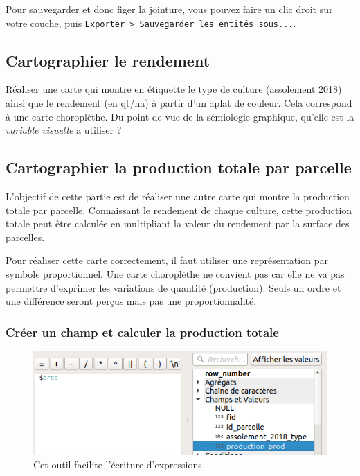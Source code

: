 Pour sauvegarder et donc figer la jointure, vous pouvez faire un clic
droit sur votre couche, puis
\texttt{Exporter\ \textgreater{}\ Sauvegarder\ les\ entités\ sous...}.

\subsection{Cartographier le
rendement}\label{cartographier-le-rendement}

Réaliser une carte qui montre en étiquette le type de culture
(assolement 2018) ainsi que le rendement (en qt/ha) à partir d'un aplat
de couleur. Cela correspond à une carte choroplèthe. Du point de vue de
la sémiologie graphique, qu'elle est la \emph{variable visuelle} a
utiliser ?

\subsection{Cartographier la production totale par
parcelle}\label{cartographier-la-production-totale-par-parcelle}

L'objectif de cette partie est de réaliser une autre carte qui montre la
production totale par parcelle. Connaissant le rendement de chaque
culture, cette production totale peut être calculée en multipliant la
valeur du rendement par la surface des parcelles.

Pour réaliser cette carte correctement, il faut utiliser une
représentation par symbole proportionnel. Une carte choroplèthe ne
convient pas car elle ne va pas permettre d'exprimer les variations de
quantité (production). Seuls un ordre et une différence seront perçus
mais pas une proportionnalité.

\subsubsection{Créer un champ et calculer la production
totale}\label{cruxe9er-un-champ-et-calculer-la-production-totale}

\begin{figure}[htbp]
\centering
\includegraphics{figures/ajout_champ_production.png}
\caption{Cet outil facilite l'écriture d'expressions}
\end{figure}

